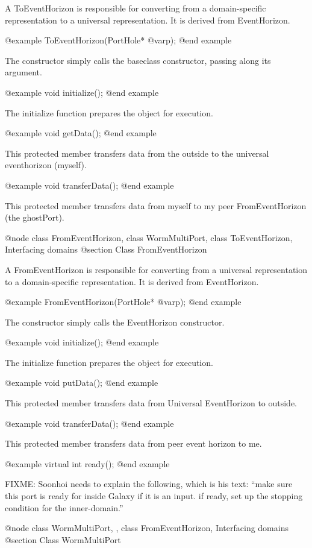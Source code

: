 A ToEventHorizon is responsible for converting from a domain-specific
representation to a universal representation.  It is derived from
EventHorizon.

@example
ToEventHorizon(PortHole* @var{p});
@end example

The constructor simply calls the baseclass constructor, passing along
its argument.

@example
void initialize();
@end example

The initialize function prepares the object for execution.

@example
void getData();
@end example

This protected member transfers data from the outside to the universal
eventhorizon (myself).

@example
void transferData();
@end example

This protected member transfers data from myself to my peer
FromEventHorizon (the ghostPort).

@node class FromEventHorizon, class WormMultiPort, class ToEventHorizon, Interfacing domains
@section Class FromEventHorizon

A FromEventHorizon is responsible for converting from a universal
representation to a domain-specific representation.  It is derived from
EventHorizon.

@example
FromEventHorizon(PortHole* @var{p});
@end example

The constructor simply calls the EventHorizon constructor.

@example
void initialize();
@end example

The initialize function prepares the object for execution.

@example
void putData();
@end example

This protected member transfers data from Universal EventHorizon to outside.

@example
void transferData();
@end example

This protected member transfers data from peer event horizon to me.

@example
virtual int ready();
@end example

FIXME: Soonhoi needs to explain the following, which is his text:
``make sure this port is ready for inside Galaxy if it is an input.
if ready, set up the stopping condition for the inner-domain.''

@node class WormMultiPort,  , class FromEventHorizon, Interfacing domains
@section Class WormMultiPort

